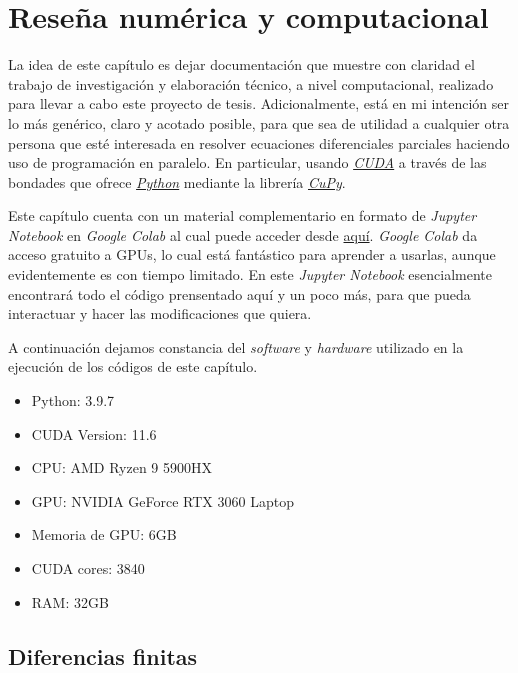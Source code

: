 \chapter{Reseña numérica y computacional}
\graphicspath{{figs/}}
\label{chap:code}

La idea de este capítulo es dejar documentación que muestre con claridad el trabajo de investigación y elaboración técnico, a nivel computacional, realizado 
para llevar a cabo este proyecto de tesis. Adicionalmente, está en mi intención ser lo más genérico, claro y acotado posible, para que sea de utilidad a cualquier 
otra persona que esté interesada en resolver ecuaciones diferenciales parciales haciendo uso de programación en paralelo. En particular, usando 
\href{https://developer.nvidia.com/cuda-toolkit}{\textit{CUDA}} a través de las bondades que ofrece \href{https://www.python.org/}{\textit{Python}} mediante 
la librería \href{https://cupy.dev/}{\textit{CuPy}}.

Este capítulo cuenta con un material complementario en formato de \textit{Jupyter Notebook} en \textit{Google Colab} al cual puede acceder desde 
\href{https://colab.research.google.com/drive/13dfbe0GnIngJ2q3w2jLOlSO6mtFYZmA7?usp=sharing}{aquí}. \textit{Google Colab} da acceso gratuito a GPUs,
lo cual está fantástico para aprender a usarlas, aunque evidentemente es con tiempo limitado. En este \textit{Jupyter Notebook} esencialmente 
encontrará todo el código prensentado aquí y un poco más, para que pueda interactuar y hacer las modificaciones que quiera.

A continuación dejamos constancia del \textit{software} y \textit{hardware} utilizado en la ejecución de los códigos de este capítulo.

\begin{itemize}
  \item Python: 3.9.7
  \item CUDA Version: 11.6
  \item CPU: AMD Ryzen 9 5900HX
  \item GPU: NVIDIA GeForce RTX 3060 Laptop
  \item Memoria de GPU: 6GB
  \item CUDA cores: 3840
  \item RAM: 32GB
\end{itemize}

\section{Diferencias finitas}
\label{S:diferencias finitas}

